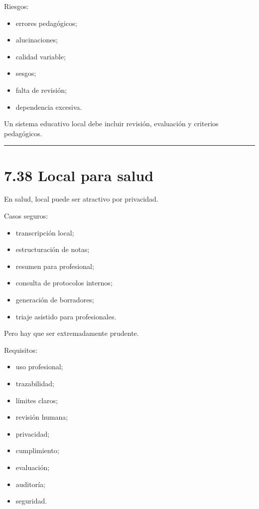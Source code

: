 Riesgos:

\begin{itemize}
\tightlist
\item
  errores pedagógicos;
\item
  alucinaciones;
\item
  calidad variable;
\item
  sesgos;
\item
  falta de revisión;
\item
  dependencia excesiva.
\end{itemize}

Un sistema educativo local debe incluir revisión, evaluación y criterios
pedagógicos.

\begin{center}\rule{0.5\linewidth}{0.5pt}\end{center}

\section{7.38 Local para salud}\label{local-para-salud}

En salud, local puede ser atractivo por privacidad.

Casos seguros:

\begin{itemize}
\tightlist
\item
  transcripción local;
\item
  estructuración de notas;
\item
  resumen para profesional;
\item
  consulta de protocolos internos;
\item
  generación de borradores;
\item
  triaje asistido para profesionales.
\end{itemize}

Pero hay que ser extremadamente prudente.

Requisitos:

\begin{itemize}
\tightlist
\item
  uso profesional;
\item
  trazabilidad;
\item
  límites claros;
\item
  revisión humana;
\item
  privacidad;
\item
  cumplimiento;
\item
  evaluación;
\item
  auditoría;
\item
  seguridad.
\end{itemize}

